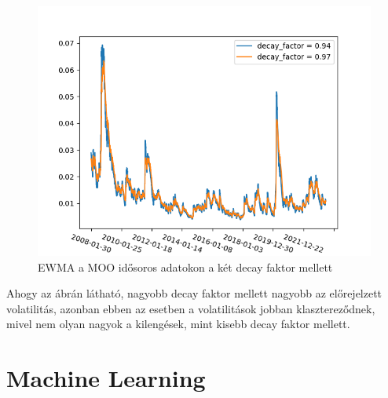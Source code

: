 \documentclass[12pt]{article}
\begin{document}
\begin{figure}[H]
	\centering
	\includegraphics[scale=0.8]{ewma}
	\caption{EWMA a MOO idősoros adatokon a két decay faktor mellett}
\end{figure}

Ahogy az ábrán látható, nagyobb decay faktor mellett nagyobb az előrejelzett volatilitás, azonban ebben az esetben a volatilitások jobban klasztereződnek, mivel nem olyan nagyok a kilengések, mint kisebb decay faktor mellett.


\section{Machine Learning}
\end{document}
